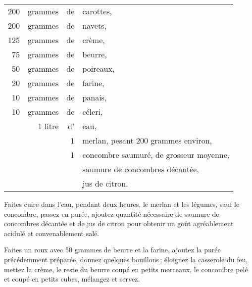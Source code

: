 \footnotesize
\begin{longtable}{rrrp{16em}}                                                    
    200 & grammes     & de  & carottes,                                                                   \\
    200 & grammes     & de  & navets,                                                                     \\
    125 & grammes     & de  & crème,                                                                      \\
     75 & grammes     & de  & beurre,                                                                     \\
     50 & grammes     & de  & poireaux,                                                                   \\
     20 & grammes     & de  & farine,                                                                     \\
     10 & grammes     & de  & panais,                                                                     \\
     10 & grammes     & de  & céleri,                                                                     \\
        & 1 litre     & d’  & eau,                                                                        \\
        &             & 1   & merlan, pesant 200 grammes environ,                                         \\
        &             & 1   & concombre saumuré, de grosseur moyenne,                                     \\
        &             &     & saumure de concombres décantée,                                             \\
        &             &     & jus de citron.                                                              \\
\end{longtable}
\normalsize

Faites cuire dans l’eau, pendant deux heures, le merlan et les légumes, sauf le
concombre, passez en purée, ajoutez quantité nécessaire de saumure de
concombres décantée et de jus de citron pour obtenir un goût agréablement
acidulé et convenablement salé.

Faites un roux avec 50 grammes de beurre et la farine, ajoutez la purée
précédemment préparée, donnez quelques bouillons ; éloignez la casserole du
feu, mettez la crème, le reste du beurre coupé en petits morceaux, le concombre
pelé et coupé en petits cubes, mélangez et servez.

